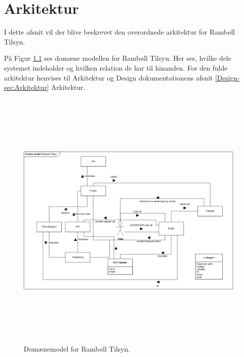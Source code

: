 \chapter{Arkitektur}
I dette afsnit vil der blive beskrevet den overordnede arkitektur for Rambøll Tilsyn.

På Figur \ref{fig:Domain} ses domæne modellen for Rambøll Tilsyn. Her ses, hvilke dele systemet indeholder og hvilken relation de har til hinanden.
For den fulde arkitektur henvises til Arkitektur og Design dokumentationens afsnit \ref{Design-sec:Arkitektur} Arkitektur.

\begin{figure}[H] %
	\centering
	\includegraphics[height=13cm, width=17cm]{Arkitektur/Domainmodel}
	\caption{Domænemodel for Rambøll Tilsyn.}
	\label{fig:Domain}
\end{figure}

\clearpage

